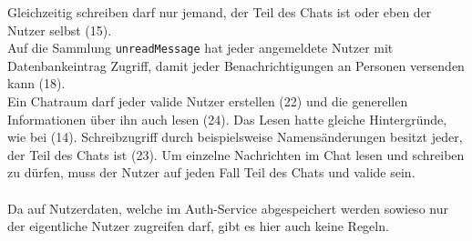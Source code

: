 Gleichzeitig schreiben darf nur jemand, der Teil des Chats ist oder eben der Nutzer selbst (15).\\
Auf die Sammlung \texttt{unreadMessage} hat jeder angemeldete Nutzer mit Datenbankeintrag Zugriff, damit jeder Benachrichtigungen an Personen versenden kann (18).\\
Ein Chatraum darf jeder valide Nutzer erstellen (22) und die generellen Informationen über ihn auch lesen (24).
Das Lesen hatte gleiche Hintergründe, wie bei (14).
Schreibzugriff durch beispielsweise Namensänderungen besitzt jeder, der Teil des Chats ist (23).
Um einzelne Nachrichten im Chat lesen und schreiben zu dürfen, muss der Nutzer auf jeden Fall Teil des Chats und valide sein.\\
\\
Da auf Nutzerdaten, welche im Auth-Service abgespeichert werden sowieso nur der eigentliche Nutzer zugreifen darf, gibt es hier auch keine Regeln.

